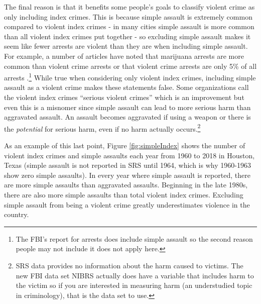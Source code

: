 \documentclass[
]{krantz}
\begin{document}
The final reason is that it benefits some people's goals to
classify violent crime as only including index crimes. This
is because simple assault is extremely common compared to
violent index crimes - in many cities simple assault is more
common than all violent index crimes put together - so
excluding simple assault makes it seem like fewer arrests
are violent than they are when including simple assault. For
example, a number of articles have noted that marijuana
arrests are more common than violent crime arrests
\citep{ingraham2016, kertscher2019, devito2020, earlenbaugh2020, aclu2020}
or that violent crime arrests are only 5\% of all arrests
\citep{neusteter2019every, speri2019}.\footnote{The FBI's
  report for arrests does include simple assault so the
  second reason people may not include it does not apply
  here.} While true when considering only violent index
crimes, including simple assault as a violent crime makes
these statements false. Some organizations call the violent
index crimes ``serious violent crimes'' which is an
improvement but even this is a misnomer since simple assault
can lead to more serious harm than aggravated assault. An
assault becomes aggravated if using a weapon or there is the
\emph{potential} for serious harm, even if no harm actually
occurs.\footnote{SRS data provides no information about the
  harm caused to victims. The new FBI data set NIBRS actually
  does have a variable that includes harm to the victim so
  if you are interested in measuring harm (an understudied
  topic in criminology), that is the data set to use.}

As an example of this last point, Figure
\ref{fig:simpleIndex} shows the number of violent index
crimes and simple assaults each year from 1960 to 2018 in
Houston, Texas (simple assault is not reported in SRS until
1964, which is why 1960-1963 show zero simple assaults). In
every year where simple assault is reported, there are more
simple assaults than aggravated assaults. Beginning in the
late 1980s, there are also more simple assaults than total
violent index crimes. Excluding simple assault from being a
violent crime greatly underestimates violence in the
country.
\end{document}
